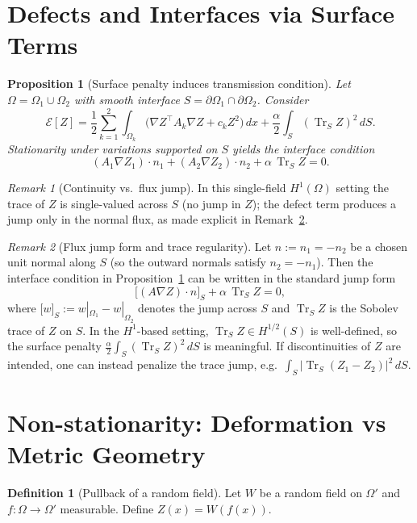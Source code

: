 \documentclass[11pt]{article}
\theoremstyle{definition}
\newtheorem{definition}{Definition}[section]
\theoremstyle{plain}
\newtheorem{proposition}{Proposition}[section]
\theoremstyle{remark}
\newtheorem{remark}{Remark}[section]
\newcommand{\trS}{\operatorname{Tr}_{S}}
\begin{document}
\section{Defects and Interfaces via Surface Terms}\label{sec:defects}

\begin{proposition}[Surface penalty induces transmission condition]\label{prop:jump}
Let $\Omega=\Omega_1\cup\Omega_2$ with smooth interface $S=\partial\Omega_1\cap\partial\Omega_2$.
Consider
\[
\mathcal{E}[Z]
=\frac12\sum_{k=1}^2\int_{\Omega_k}\big(\nabla Z^\top A_k\nabla Z+c_k Z^2\big)\,dx
+\frac{\alpha}{2}\int_S (\trS Z)^2\,dS.
\]
Stationarity under variations supported on $S$ yields the interface condition
\[
(A_1\nabla Z_1)\cdot n_1+(A_2\nabla Z_2)\cdot n_2+\alpha\,\trS Z=0.
\]
\end{proposition}

\begin{remark}[Continuity vs.\ flux jump]\label{rem:cont-vs-flux}
In this single-field $H^{1}(\Omega)$ setting the trace of $Z$ is single-valued across $S$ (no jump in $Z$);
the defect term produces a jump only in the normal flux, as made explicit in Remark~\ref{rem:jumpform}.
\end{remark}

\begin{remark}[Flux jump form and trace regularity]\label{rem:jumpform}
Let $n:=n_1=-n_2$ be a chosen unit normal along $S$ (so the outward normals satisfy $n_2=-n_1$).
Then the interface condition in Proposition~\ref{prop:jump} can be written in the standard jump form
\[
\big[(A\nabla Z)\cdot n\big]_{S}+\alpha\,\trS Z=0,
\]
where $\big[w\big]_{S}:=w|_{\Omega_1}-w|_{\Omega_2}$ denotes the jump across $S$ and $\trS Z$ is the Sobolev trace of $Z$ on $S$.
In the $H^1$-based setting, $\trS Z\in H^{1/2}(S)$ is well-defined, so the surface penalty
$\frac{\alpha}{2}\int_S (\trS Z)^2\,dS$ is meaningful. If discontinuities of $Z$ are intended, one can instead penalize the trace jump,
e.g.\ $\int_S |\trS(Z_1-Z_2)|^2\,dS$.
\end{remark}

\section{Non-stationarity: Deformation vs Metric Geometry}\label{sec:deformation}

\begin{definition}[Pullback of a random field]\label{def:pullback}
Let $W$ be a random field on $\Omega'$ and $f:\Omega\to\Omega'$ measurable.
Define $Z(x)=W(f(x))$.
\end{definition}
\end{document}
